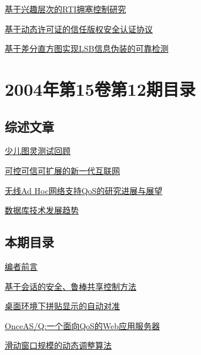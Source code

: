 \documentclass[a4paper]{article}
\begin{document}
\href{http://www.jos.org.cn/ch/reader/download_pdf.aspx?file_no=20040115&year_id=2004&quarter_id=1&falg=1}{基于兴趣层次的RTI拥塞控制研究}

\href{http://www.jos.org.cn/ch/reader/download_pdf.aspx?file_no=20040116&year_id=2004&quarter_id=1&falg=1}{基于动态许可证的信任版权安全认证协议}

\href{http://www.jos.org.cn/ch/reader/download_pdf.aspx?file_no=20040118&year_id=2004&quarter_id=1&falg=1}{基于差分直方图实现LSB信息伪装的可靠检测}


\section{\textbf{2004年第15卷第12期目录}}
\subsection{综述文章}
\href{http://www.jos.org.cn/ch/reader/download_pdf.aspx?file_no=20041202&year_id=2004&quarter_id=12&falg=1}{少儿图灵测试回顾}

\href{http://www.jos.org.cn/ch/reader/download_pdf.aspx?file_no=20041207&year_id=2004&quarter_id=12&falg=1}{可控可信可扩展的新一代互联网}

\href{http://www.jos.org.cn/ch/reader/download_pdf.aspx?file_no=20041214&year_id=2004&quarter_id=12&falg=1}{无线Ad Hoc网络支持QoS的研究进展与展望}

\href{http://www.jos.org.cn/ch/reader/download_pdf.aspx?file_no=20041208&year_id=2004&quarter_id=12&falg=1}{数据库技术发展趋势}

\subsection{本期目录}
\href{http://www.jos.org.cn/ch/reader/download_pdf.aspx?file_no=20041201&year_id=2004&quarter_id=12&falg=1}{编者前言}

\href{http://www.jos.org.cn/ch/reader/download_pdf.aspx?file_no=20041203&year_id=2004&quarter_id=12&falg=1}{基于会话的安全、鲁棒共享控制方法}

\href{http://www.jos.org.cn/ch/reader/download_pdf.aspx?file_no=20041204&year_id=2004&quarter_id=12&falg=1}{桌面环境下拼贴显示的自动对准}

\href{http://www.jos.org.cn/ch/reader/download_pdf.aspx?file_no=20041205&year_id=2004&quarter_id=12&falg=1}{OnceAS/Q:一个面向QoS的Web应用服务器}

\href{http://www.jos.org.cn/ch/reader/download_pdf.aspx?file_no=20041206&year_id=2004&quarter_id=12&falg=1}{滑动窗口规模的动态调整算法}
\end{document}
